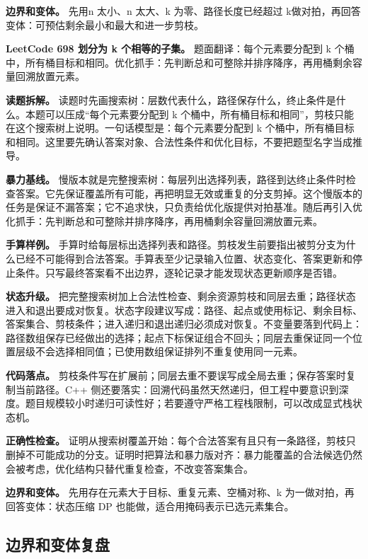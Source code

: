 \textbf{边界和变体。} 先用n 太小、n 太大、k 为零、路径长度已经超过 k做对拍，再回答变体：可预估剩余最小和最大和进一步剪枝。

\noindent\textbf{LeetCode 698 划分为 k 个相等的子集。} 题面翻译：每个元素要分配到 k 个桶中，所有桶目标和相同。优化抓手：先判断总和可整除并排序降序，再用桶剩余容量回溯放置元素。

\textbf{读题拆解。} 读题时先画搜索树：层数代表什么，路径保存什么，终止条件是什么。本题可以压成“每个元素要分配到 k 个桶中，所有桶目标和相同”，剪枝只能在这个搜索树上说明。一句话模型是：每个元素要分配到 k 个桶中，所有桶目标和相同。这里要先确认答案对象、合法性条件和优化目标，不要把题型名字当成推导。

\textbf{暴力基线。} 慢版本就是完整搜索树：每层列出选择列表，路径到达终止条件时检查答案。它先保证覆盖所有可能，再把明显无效或重复的分支剪掉。这个慢版本的任务是保证不漏答案；它不追求快，只负责给优化版提供对拍基准。随后再引入优化抓手：先判断总和可整除并排序降序，再用桶剩余容量回溯放置元素。

\textbf{手算样例。} 手算时给每层标出选择列表和路径。剪枝发生前要指出被剪分支为什么已经不可能得到合法答案。手算表至少记录输入位置、状态变化、答案更新和停止条件。只写最终答案看不出边界，逐轮记录才能发现状态更新顺序是否错。

\textbf{状态升级。} 把完整搜索树加上合法性检查、剩余资源剪枝和同层去重；路径状态进入和退出要成对恢复。状态字段建议写成：路径、起点或使用标记、剩余目标、答案集合、剪枝条件；进入递归和退出递归必须成对恢复。不变量要落到代码上：路径数组保存已经做出的选择；起点下标保证组合不回头；同层去重保证同一个位置层级不会选择相同值；已使用数组保证排列不重复使用同一元素。

\textbf{代码落点。} 剪枝条件写在扩展前；同层去重不要误写成全局去重；保存答案时复制当前路径。C++ 侧还要落实：回溯代码虽然天然递归，但工程中要意识到深度。题目规模较小时递归可读性好；若要遵守严格工程栈限制，可以改成显式栈状态机。

\textbf{正确性检查。} 证明从搜索树覆盖开始：每个合法答案有且只有一条路径，剪枝只删掉不可能成功的分支。证明时把算法和暴力版对齐：暴力能覆盖的合法候选仍然会被考虑，优化结构只替代重复检查，不改变答案集合。

\textbf{边界和变体。} 先用存在元素大于目标、重复元素、空桶对称、k 为一做对拍，再回答变体：状态压缩 DP 也能做，适合用掩码表示已选元素集合。

\subsection{边界和变体复盘}

